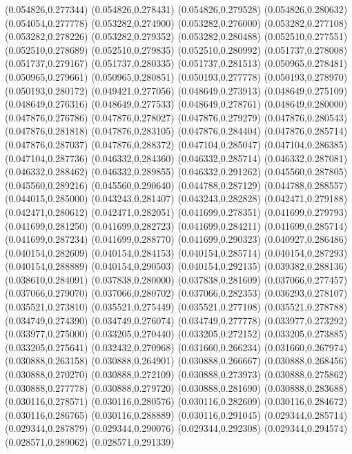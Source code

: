 (0.054826,0.277344)
(0.054826,0.278431)
(0.054826,0.279528)
(0.054826,0.280632)
(0.054054,0.277778)
(0.053282,0.274900)
(0.053282,0.276000)
(0.053282,0.277108)
(0.053282,0.278226)
(0.053282,0.279352)
(0.053282,0.280488)
(0.052510,0.277551)
(0.052510,0.278689)
(0.052510,0.279835)
(0.052510,0.280992)
(0.051737,0.278008)
(0.051737,0.279167)
(0.051737,0.280335)
(0.051737,0.281513)
(0.050965,0.278481)
(0.050965,0.279661)
(0.050965,0.280851)
(0.050193,0.277778)
(0.050193,0.278970)
(0.050193,0.280172)
(0.049421,0.277056)
(0.048649,0.273913)
(0.048649,0.275109)
(0.048649,0.276316)
(0.048649,0.277533)
(0.048649,0.278761)
(0.048649,0.280000)
(0.047876,0.276786)
(0.047876,0.278027)
(0.047876,0.279279)
(0.047876,0.280543)
(0.047876,0.281818)
(0.047876,0.283105)
(0.047876,0.284404)
(0.047876,0.285714)
(0.047876,0.287037)
(0.047876,0.288372)
(0.047104,0.285047)
(0.047104,0.286385)
(0.047104,0.287736)
(0.046332,0.284360)
(0.046332,0.285714)
(0.046332,0.287081)
(0.046332,0.288462)
(0.046332,0.289855)
(0.046332,0.291262)
(0.045560,0.287805)
(0.045560,0.289216)
(0.045560,0.290640)
(0.044788,0.287129)
(0.044788,0.288557)
(0.044015,0.285000)
(0.043243,0.281407)
(0.043243,0.282828)
(0.042471,0.279188)
(0.042471,0.280612)
(0.042471,0.282051)
(0.041699,0.278351)
(0.041699,0.279793)
(0.041699,0.281250)
(0.041699,0.282723)
(0.041699,0.284211)
(0.041699,0.285714)
(0.041699,0.287234)
(0.041699,0.288770)
(0.041699,0.290323)
(0.040927,0.286486)
(0.040154,0.282609)
(0.040154,0.284153)
(0.040154,0.285714)
(0.040154,0.287293)
(0.040154,0.288889)
(0.040154,0.290503)
(0.040154,0.292135)
(0.039382,0.288136)
(0.038610,0.284091)
(0.037838,0.280000)
(0.037838,0.281609)
(0.037066,0.277457)
(0.037066,0.279070)
(0.037066,0.280702)
(0.037066,0.282353)
(0.036293,0.278107)
(0.035521,0.273810)
(0.035521,0.275449)
(0.035521,0.277108)
(0.035521,0.278788)
(0.034749,0.274390)
(0.034749,0.276074)
(0.034749,0.277778)
(0.033977,0.273292)
(0.033977,0.275000)
(0.033205,0.270440)
(0.033205,0.272152)
(0.033205,0.273885)
(0.033205,0.275641)
(0.032432,0.270968)
(0.031660,0.266234)
(0.031660,0.267974)
(0.030888,0.263158)
(0.030888,0.264901)
(0.030888,0.266667)
(0.030888,0.268456)
(0.030888,0.270270)
(0.030888,0.272109)
(0.030888,0.273973)
(0.030888,0.275862)
(0.030888,0.277778)
(0.030888,0.279720)
(0.030888,0.281690)
(0.030888,0.283688)
(0.030116,0.278571)
(0.030116,0.280576)
(0.030116,0.282609)
(0.030116,0.284672)
(0.030116,0.286765)
(0.030116,0.288889)
(0.030116,0.291045)
(0.029344,0.285714)
(0.029344,0.287879)
(0.029344,0.290076)
(0.029344,0.292308)
(0.029344,0.294574)
(0.028571,0.289062)
(0.028571,0.291339)
